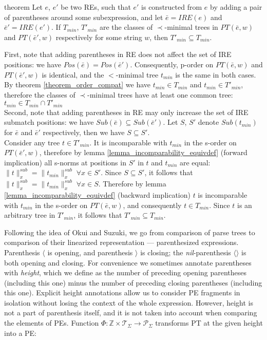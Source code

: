 \documentclass[AMA,STIX1COL]{WileyNJD-v2}
\newcommand{\Xl}{\langle}
\newcommand{\Xr}{\rangle}
\newcommand{\Xm}{\langle\!\rangle}
\newcommand{\XP}{\mathcal{P}}
\newcommand{\XT}{\mathcal{T}}
\newcommand{\YZ}{\mathbb{Z}}
\newcommand{\PT}{PT}
\newcommand{\IRE}{I\!RE}
\newcommand{\snorm}[2]{\|{#1}\|^{sub}_{#2}}
\begin{document}
\begin{theoremEnd}[restate, no link to proof, no link to theorem, category=theorem_order_compat]{theorem}
    \label{theorem_submatch_refinement}
    Let $e$, $e'$ be two REs, such that $e'$ is constructed from $e$ by adding a pair of parentheses around some subexpression,
    and let $\bar{e} = \IRE(e)$ and $\bar{e}' = \IRE(e')$.
    If $T_{min}$, $T'_{min}$ are the classes of $\prec$-minimal trees
    in $\PT(\bar{e}, w)$ and $\PT(\bar{e}', w)$ respectively for some string $w$,
    then $T'_{min} \subseteq T_{min}$.
\end{theoremEnd}
\begin{proofEnd}
    First, note that adding parentheses in RE
    does not affect the set of IRE positions: we have $Pos(\bar{e}) = Pos(\bar{e}')$.
    Consequently, p-order on $\PT(\bar{e}, w)$ and $\PT(\bar{e}', w)$ is identical,
    and the $<$-minimal tree $t_{min}$ is the same in both cases.
    By theorem \ref{theorem_order_compat} we have $t_{min} \in T_{min}$ and $t_{min} \in T'_{min}$,
    therefore the classes of $\prec$-minimal trees have at least one common tree: $t_{min} \in T_{min} \cap T'_{min}$
    \\[0.5em]
    Second, note that adding parentheses in RE
    may only increase the set of IRE submatch positions: we have $Sub(\bar{e}) \subseteq Sub(\bar{e}')$.
    Let $S$, $S'$ denote $Sub(t_{min})$ for $\bar{e}$ and $\bar{e}'$ respectively,
    then we have $S \subseteq S'$.
    \\[0.5em]
    Consider any tree $t \in T'_{min}$.
    It is incomparable with $t_{min}$ in the s-order on $\PT(\bar{e}', w)$,
    therefore by lemma \ref{lemma_incomparability_equivdef} (forward implication)
    all s-norms at positions in $S'$ in $t$ and $t_{min}$ are equal: $\snorm{t}{x} = \snorm{t_{min}}{x} \; \forall x \in S'$.
    Since $S \subseteq S'$, it follows that $\snorm{t}{x} = \snorm{t_{min}}{x} \; \forall x \in S$.
    Therefore by lemma \ref{lemma_incomparability_equivdef} (backward implication)
    $t$ is incomparable with $t_{min}$ in the s-order on $\PT(\bar{e}, w)$,
    and consequently $t \in T_{min}$.
    Since $t$ is an arbitrary tree in $T'_{min}$, it follows that $T'_{min} \subseteq T_{min}$.
\end{proofEnd}

Following the idea of Okui and Suzuki,
we go from comparison of parse trees to comparison of their linearized representation --- parenthesized expressions.
Parenthesis $\Xl$ is opening, and
parenthesis $\Xr$ is closing;
the \emph{nil}-parenthesis $\Xm$ is both opening and closing.
For convenience we sometimes annotate parentheses with \emph{height},
which we define as the number of preceding opening parentheses (including this one)
minus the number of preceding closing parentheses (including this one).
Explicit height annotations allow us to consider PE fragments in isolation
without losing the context of the whole expression.
However, height is not a part of parenthesis itself,
and it is not taken into account when comparing the elements of PEs.
Function $\Phi : \YZ \times \XT_\Sigma \rightarrow \XP_\Sigma$ transforms PT at the given height into a PE:
\end{document}
